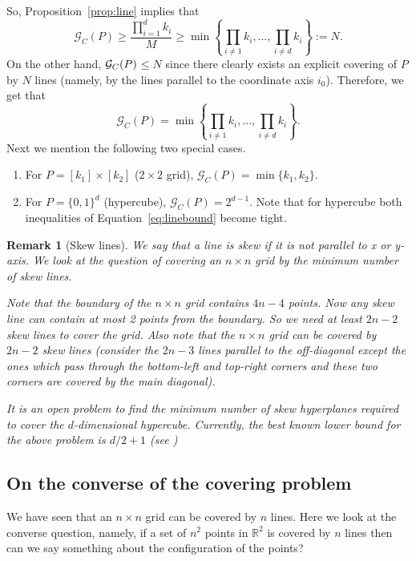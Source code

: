 \documentclass[
final
]{dmtcs-episciences}
\numberwithin{equation}{subsection}
\newtheorem{rmk}[defn]{Remark}
\newcommand{\ga}{${\cal G}_C(P)$}
\begin{document}
\medskip	

So, Proposition~\ref{prop:line} implies that 
$$\mathcal{G}_C(P) \geq \frac{\prod_{i=1}^dk_i}{M} \geq \min\left\{ \prod_{i \ne 1} k_i, \ldots,\prod_{i\ne d}k_i \right\}:=N.$$
On the other hand, \ga$\leq N$ since there clearly exists an explicit covering of $P$ by $N$ lines (namely, by the lines parallel to the coordinate axis $i_0$). Therefore, we get that
$$\mathcal{G}_C(P)= \min\left\{ \prod_{i\ne 1}k_i,\ldots ,\prod_{i\ne d}k_i \right\}.$$ Next we mention the following two special cases.
\begin{enumerate}
	\item[(i)] For $P=[k_1]\times [k_2]$ ($2\times 2$ grid),
	$\mathcal{G}_C(P)=\min\{k_1,k_2\}.$
	
	\item[(ii)] For $P=\{0,1\}^d$ (hypercube),
	$\mathcal{G}_C(P)=2^{d-1}.$
	Note that for hypercube both inequalities of Equation~\ref{eq:linebound} become tight.
\end{enumerate}

\begin{rmk}[Skew lines]
	We say that a line is {\it skew} if it is not parallel to x or y-axis. We look at the question of covering an $n\times n$ grid by the minimum number of skew lines.
	
	\medskip		
	
	Note that the boundary of the $n\times n$ grid contains $4n-4$ points. Now any skew line can contain at most 2 points from the boundary. So we need at least $2n-2$ skew lines to cover the grid. Also note that the $n\times n$ grid can be covered by $2n-2$ skew lines (consider the $2n-3$ lines parallel to the off-diagonal except the ones which pass through the bottom-left and top-right corners and these two corners are covered by the main diagonal).
	
	\medskip
	
	It is an {\it open problem} to find the minimum number of skew hyperplanes required to cover the $d$-dimensional hypercube. Currently, the best known lower bound for the above problem is $d/2+1$ (see \cite{ivanisvili2025, saurmann2024, linial2005})
	
\end{rmk}


\subsection{On the converse of the covering problem}\label{ssec:conversecover}
\noindent
We have seen that an $n\times n$ grid can be covered by $n$ lines. Here we look at the converse question, namely, if a set of $n^2$ points in $\mathbb{R}^2$ is covered by $n$ lines then can we say something about the configuration of the points?
\end{document}
